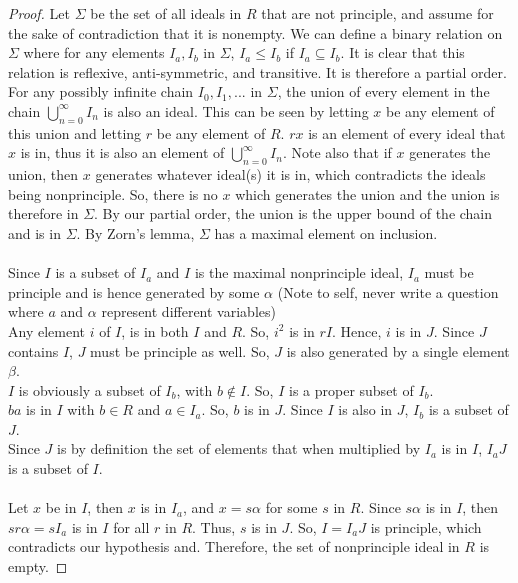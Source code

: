 \documentclass[10pt]{article}
\newenvironment{problem}[2][Problem]{\begin{trivlist}
		\item[\hskip \labelsep {\bfseries #1}\hskip \labelsep {\bfseries #2.}]}{\end{trivlist}}
\begin{document}
\begin{problem}{2.6}
		\begin{proof}
			Let $\Sigma$ be the set of all ideals in $R$ that are not principle, and assume for the sake of contradiction that it is nonempty. We can define a binary relation on $\Sigma$ where for any elements $I_{a}, I_{b}$ in $\Sigma$, $I_{a} \leq I_{b}$ if $I_{a} \subseteq I_{b}$. It is clear that this relation is reflexive, anti-symmetric, and transitive. It is therefore a partial order. For any possibly infinite chain $I_{0}, I_{1}, ...$ in $\Sigma$, the union of every element in the chain $ \bigcup_{n=0}^{\infty} I_{n}$ is also an ideal. This can be seen by letting $x$ be any element of this union and letting $r$ be any element of $R$. $rx$ is an element of every ideal that $x$ is in, thus it is also an element of $ \bigcup_{n=0}^{\infty} I_{n}$. Note also that if $x$ generates the union, then $x$ generates whatever ideal(s) it is in, which contradicts the ideals being nonprinciple. So, there is no $x$ which generates the union and the union is therefore in $\Sigma$. By our partial order, the union is the upper bound of the chain and is in $\Sigma$. By Zorn's lemma, $\Sigma$ has a maximal element on inclusion.\\
			\\
			Since $I $ is a subset of $I_{a}$ and $I$ is the maximal nonprinciple ideal, $I_{a}$ must be principle and is hence generated by some $\alpha$ (Note to self, never write a question where $a$ and $\alpha$ represent different variables)\\
			Any element $i$ of $I$, is in both $I$ and $R$. So, $i^{2}$ is in $rI$. Hence, $i$ is in $J$. Since $J$ contains $I$, $J$ must be principle as well. So, $J$ is also generated by a single element $\beta$.\\
			$I$ is obviously a subset of $I_{b}$, with $b \notin I$. So, $I$ is a proper subset of $I_{b}$.\\
			$ba$ is in $I$ with $b \in R$ and $a \in I_{a}$. So, $b$ is in $J$. Since $I$ is also in $J$, $I_{b}$ is a subset of $J$.\\
			Since $J$ is by definition the set of elements that when multiplied by $I_{a}$ is in $I$, $I_{a}J$ is a subset of $I$.\\
			\\
			Let $x$ be in $I$, then $x$ is in $I_{a}$, and $x = s\alpha$ for some $s$ in $R$. Since $s\alpha$ is in $I$, then $sr\alpha = sI_{a}$ is in $I$ for all $r$ in $R$. Thus, $s$ is in $J$. So, $I=I_{a}J$ is principle, which contradicts our hypothesis and. Therefore, the set of nonprinciple ideal in $R$ is empty.
		\end{proof}
		
	\end{problem}
\end{document}
